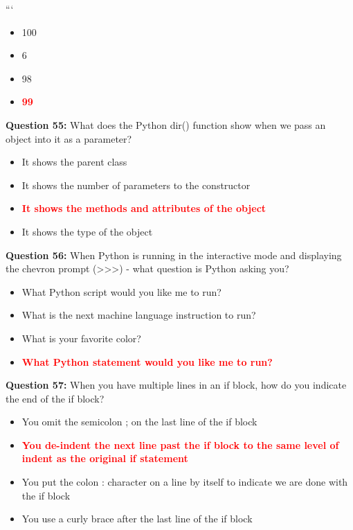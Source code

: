 \documentclass[12pt,a4paper]{article}
\begin{document}
\newline
```

\begin{itemize}
    \item[\textbf{A.}] 100
    \item[\textbf{B.}] 6
    \item[\textbf{C.}] 98
    \item[\textbf{D.}] \textcolor{red}{\textbf{99}}
\end{itemize}

\vspace{0.5cm}

\textbf{Question 55:} What does the Python dir() function show when we pass an object into it as a parameter?

\begin{itemize}
    \item[\textbf{A.}] It shows the parent class
    \item[\textbf{B.}] It shows the number of parameters to the constructor
    \item[\textbf{C.}] \textcolor{red}{\textbf{It shows the methods and attributes of the object}}
    \item[\textbf{D.}] It shows the type of the object
\end{itemize}

\vspace{0.5cm}

\textbf{Question 56:} When Python is running in the interactive mode and displaying the chevron prompt (>>>) - what question is Python asking you?

\begin{itemize}
    \item[\textbf{A.}] What Python script would you like me to run?
    \item[\textbf{B.}] What is the next machine language instruction to run?
    \item[\textbf{C.}] What is your favorite color?
    \item[\textbf{D.}] \textcolor{red}{\textbf{What Python statement would you like me to run?}}
\end{itemize}

\vspace{0.5cm}

\textbf{Question 57:} When you have multiple lines in an if block, how do you indicate the end of the if block?

\begin{itemize}
    \item[\textbf{A.}] You omit the semicolon ; on the last line of the if block
    \item[\textbf{B.}] \textcolor{red}{\textbf{You de-indent the next line past the if block to the same level of indent as the original if statement}}
    \item[\textbf{C.}] You put the colon : character on a line by itself to indicate we are done with the if block
    \item[\textbf{D.}] You use a curly brace  after the last line of the if block
\end{itemize}
\end{document}
